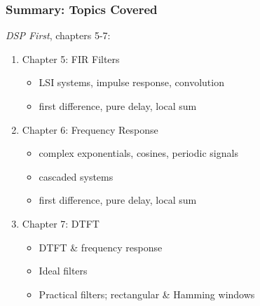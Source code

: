 \documentclass{beamer}
\begin{document}
\begin{frame}
  \frametitle{Summary: Topics Covered}

  {\em DSP First}, chapters 5-7:
  \begin{enumerate}
  \item Chapter 5: FIR Filters
    \begin{itemize}
    \item LSI systems, impulse response, convolution
    \item first difference, pure delay, local sum
    \end{itemize}
  \item Chapter 6: Frequency Response
    \begin{itemize}
    \item complex exponentials, cosines, periodic signals
    \item cascaded systems
    \item first difference, pure delay, local sum
    \end{itemize}
  \item Chapter 7: DTFT
    \begin{itemize}
    \item DTFT \& frequency response
    \item Ideal filters
    \item Practical filters; rectangular \& Hamming windows
    \end{itemize}
  \end{enumerate}
\end{frame}
\end{document}
